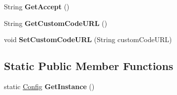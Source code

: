 \begin{DoxyCompactItemize}
\item 
\hypertarget{classcom_1_1shephertz_1_1app42_1_1paas_1_1sdk_1_1csharp_1_1_config_ab7c89e231da2103b512e995656fc24c5}{String {\bfseries Get\+Accept} ()}\label{classcom_1_1shephertz_1_1app42_1_1paas_1_1sdk_1_1csharp_1_1_config_ab7c89e231da2103b512e995656fc24c5}

\item 
\hypertarget{classcom_1_1shephertz_1_1app42_1_1paas_1_1sdk_1_1csharp_1_1_config_a3324382d96ba5709126f58563a4bbfe8}{String {\bfseries Get\+Custom\+Code\+U\+R\+L} ()}\label{classcom_1_1shephertz_1_1app42_1_1paas_1_1sdk_1_1csharp_1_1_config_a3324382d96ba5709126f58563a4bbfe8}

\item 
\hypertarget{classcom_1_1shephertz_1_1app42_1_1paas_1_1sdk_1_1csharp_1_1_config_a4dce34e23e3a23c271952e8d4b3b6618}{void {\bfseries Set\+Custom\+Code\+U\+R\+L} (String custom\+Code\+U\+R\+L)}\label{classcom_1_1shephertz_1_1app42_1_1paas_1_1sdk_1_1csharp_1_1_config_a4dce34e23e3a23c271952e8d4b3b6618}

\end{DoxyCompactItemize}
\subsection*{Static Public Member Functions}
\begin{DoxyCompactItemize}
\item 
\hypertarget{classcom_1_1shephertz_1_1app42_1_1paas_1_1sdk_1_1csharp_1_1_config_a638691f46423dcfb029210ff0ef897b0}{static \hyperlink{classcom_1_1shephertz_1_1app42_1_1paas_1_1sdk_1_1csharp_1_1_config}{Config} {\bfseries Get\+Instance} ()}\label{classcom_1_1shephertz_1_1app42_1_1paas_1_1sdk_1_1csharp_1_1_config_a638691f46423dcfb029210ff0ef897b0}

\end{DoxyCompactItemize}
